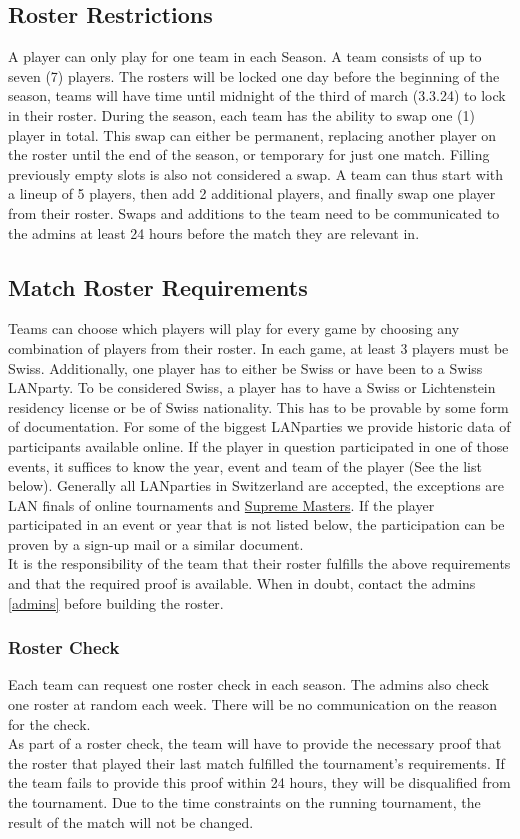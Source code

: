\documentclass{article}
\begin{document}
\subsection{Roster Restrictions}
A player can only play for one team in each Season. 
A team consists of up to seven (7) players. The rosters will be locked one day before the beginning of the season, teams will have time until midnight of the third of march (3.3.24) to lock in their roster. During the season, each team has the ability to swap one (1) player in total. This swap can either be permanent, replacing another player on the roster until the end of the season, or temporary for just one match. Filling previously empty slots is also not considered a swap. A team can thus start with a lineup of 5 players, then add 2 additional players, and finally swap one player from their roster.
Swaps and additions to the team need to be communicated to the admins at least 24 hours before the match they are relevant in.

\subsection{Match Roster Requirements}
Teams can choose which players will play for every game by choosing any combination of players from their roster.
In each game, at least 3 players must be Swiss. Additionally, one player has to either be Swiss or have been to a Swiss LANparty.
To be considered Swiss, a player has to have a Swiss or Lichtenstein residency license or be of Swiss nationality. This has to be provable by some form of documentation.
For some of the biggest LANparties we provide historic data of participants available online. If the player in question 
participated in one of those events, it suffices to know the year, event and team of the player (See the list below). Generally 
all LANparties in Switzerland are accepted, the exceptions are LAN finals of online tournaments and 
\href{https://www.suprememasters.gg/}{Supreme Masters}. If the player participated in an event or year that is not listed below, 
the participation can be proven by a sign-up mail or a similar document.\\
It is the responsibility of the team that their roster fulfills the above requirements and that the required proof is available. 
When in doubt, contact the admins \ref{admins} before building the roster.

\subsubsection{Roster Check}
Each team can request one roster check in each season. The admins also check one roster at random each week. There will be no communication on the reason for the check.\\
As part of a roster check, the team will have to provide the necessary proof that the roster that played their last match fulfilled the tournament's requirements. If the team fails to provide this proof within 24 hours, they will be disqualified from the tournament. Due to the time constraints on the running tournament, the result of the match will not be changed.
\end{document}
